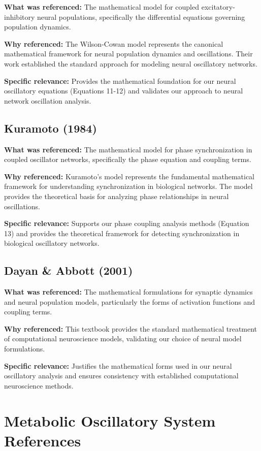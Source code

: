 \documentclass{article}
\begin{document}
\textbf{What was referenced:} The mathematical model for coupled excitatory-inhibitory neural populations, specifically the differential equations governing population dynamics.

\textbf{Why referenced:} The Wilson-Cowan model represents the canonical mathematical framework for neural population dynamics and oscillations. Their work established the standard approach for modeling neural oscillatory networks.

\textbf{Specific relevance:} Provides the mathematical foundation for our neural oscillatory equations (Equations 11-12) and validates our approach to neural network oscillation analysis.

\subsection{Kuramoto (1984)}

\textbf{What was referenced:} The mathematical model for phase synchronization in coupled oscillator networks, specifically the phase equation and coupling terms.

\textbf{Why referenced:} Kuramoto's model represents the fundamental mathematical framework for understanding synchronization in biological networks. The model provides the theoretical basis for analyzing phase relationships in neural oscillations.

\textbf{Specific relevance:} Supports our phase coupling analysis methods (Equation 13) and provides the theoretical framework for detecting synchronization in biological oscillatory networks.

\subsection{Dayan \& Abbott (2001)}

\textbf{What was referenced:} The mathematical formulations for synaptic dynamics and neural population models, particularly the forms of activation functions and coupling terms.

\textbf{Why referenced:} This textbook provides the standard mathematical treatment of computational neuroscience models, validating our choice of neural model formulations.

\textbf{Specific relevance:} Justifies the mathematical forms used in our neural oscillatory analysis and ensures consistency with established computational neuroscience methods.

\section{Metabolic Oscillatory System References}
\end{document}
